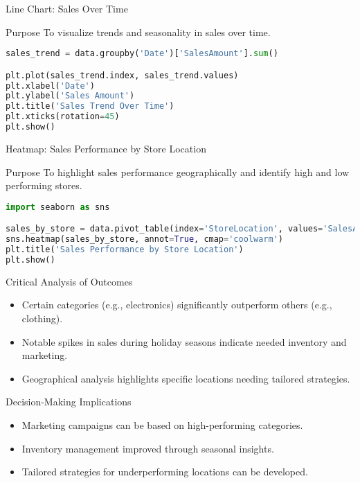 \documentclass[aspectratio=169]{beamer}
\begin{document}
\begin{frame}[fragile]{Line Chart: Sales Over Time}
  \begin{block}{Purpose}
    To visualize trends and seasonality in sales over time.
  \end{block}

  \begin{lstlisting}[language=Python]
sales_trend = data.groupby('Date')['SalesAmount'].sum()

plt.plot(sales_trend.index, sales_trend.values)
plt.xlabel('Date')
plt.ylabel('Sales Amount')
plt.title('Sales Trend Over Time')
plt.xticks(rotation=45)
plt.show()
  \end{lstlisting}
\end{frame}

\begin{frame}[fragile]{Heatmap: Sales Performance by Store Location}
  \begin{block}{Purpose}
    To highlight sales performance geographically and identify high and low performing stores.
  \end{block}

  \begin{lstlisting}[language=Python]
import seaborn as sns

sales_by_store = data.pivot_table(index='StoreLocation', values='SalesAmount', aggfunc='sum')
sns.heatmap(sales_by_store, annot=True, cmap='coolwarm')
plt.title('Sales Performance by Store Location')
plt.show()
  \end{lstlisting}
\end{frame}

\begin{frame}{Critical Analysis of Outcomes}
  \begin{itemize}
    \item Certain categories (e.g., electronics) significantly outperform others (e.g., clothing).
    \item Notable spikes in sales during holiday seasons indicate needed inventory and marketing.
    \item Geographical analysis highlights specific locations needing tailored strategies.
  \end{itemize}

  \begin{block}{Decision-Making Implications}
    \begin{itemize}
      \item Marketing campaigns can be based on high-performing categories.
      \item Inventory management improved through seasonal insights.
      \item Tailored strategies for underperforming locations can be developed.
    \end{itemize}
  \end{block}
\end{frame}
\end{document}
